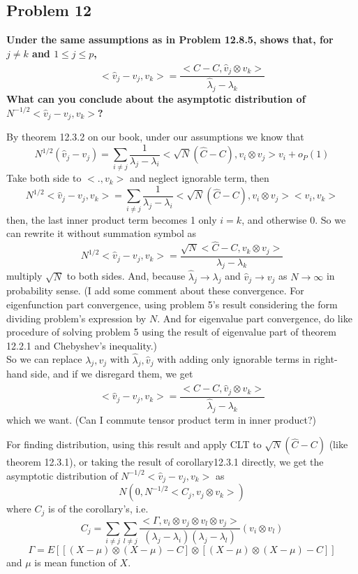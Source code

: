 \documentclass{article}
\begin{document}
\subsection{Problem 12}
\textbf{
Under the same assumptions as in Problem 12.8.5,
shows that, for $j\neq k$ and $1\leq j \leq p$,
\[<\hat{v}_j-v_j, v_k>=\frac{<\hat{C}-C,\hat{v}_j \otimes v_k>}{\hat{\lambda}_j-\lambda_k}\]
What can you conclude about the asymptotic distribution of $N^{-1/2}<\hat{v}_j-v_j,v_k>$?
}

By theorem 12.3.2 on our book, under our assumptions we know that 
\[N^{1/2}(\hat{v}_j-v_j)=\sum_{i\neq j}\frac{1}{\lambda_j-\lambda_i}<\sqrt{N}(\hat{C}-C), v_i\otimes v_j>v_i+o_P(1)\]
Take both side to $<., v_k>$ and neglect ignorable term, then
\[N^{1/2}<\hat{v}_j-v_j,v_k>=\sum_{i\neq j}\frac{1}{\lambda_j-\lambda_i}<\sqrt{N}(\hat{C}-C), v_i\otimes v_j><v_i,v_k>\]
then, the last inner product term becomes 1 only $i=k$, and otherwise 0. So we can rewrite it without summation symbol as 
\[N^{1/2}<\hat{v}_j-v_j,v_k>=\frac{\sqrt{N}<\hat{C}-C, v_k\otimes v_j>}{\lambda_j-\lambda_k}\]
multiply $\sqrt{N}$ to both sides.
And, because $\hat{\lambda}_j\rightarrow\lambda_j$ and $\hat{v}_j\rightarrow v_j$ as $N\rightarrow \infty$
in probability sense.
(I add some comment about these convergence. For eigenfunction part convergence, using problem 5's result considering the form dividing problem's expression by $N$. 
And for eigenvalue part convergence, do like procedure of solving problem 5 using the result of eigenvalue part of theorem 12.2.1 and Chebyshev's inequality.)\\ 
So we can replace $\lambda_j, v_j$ with $\hat{\lambda}_j,\hat{v}_j$ with adding only ignorable terms in right-hand side,
and if we disregard them, we get
\[<\hat{v}_j-v_j, v_k>=\frac{<\hat{C}-C,\hat{v}_j \otimes v_k>}{\hat{\lambda}_j-\lambda_k}\]
which we want. (Can I commute tensor product term in inner product?)

For finding distribution, using this result and apply CLT to $\sqrt{N}(\hat{C}-C)$ (like theorem 12.3.1), or taking the result of corollary12.3.1 directly, 
we get the asymptotic distribution of \(N^{-1/2}<\hat{v}_j-v_j,v_k>\) as
\[N(0, N^{-1/2}<C_j,v_j \otimes v_k>)\]
where $C_j$ is of the corollary's, i.e.
\[C_j=\sum_{i\neq j}\sum_{l\neq j}\frac{<\Gamma,v_i\otimes v_j\otimes v_l\otimes v_j>}
{(\lambda_j-\lambda_i)(\lambda_j-\lambda_l)}(v_i \otimes v_l)\]
\[\Gamma=E[[(X-\mu)\otimes(X-\mu)-C]\otimes[(X-\mu)\otimes(X-\mu)-C]]\]
and $\mu$ is mean function of $X$.
\end{document}
